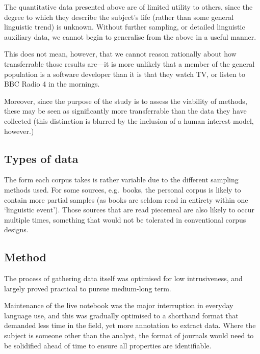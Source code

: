 

The quantitative data presented above are of limited utility to others, since the degree to which they describe the subject's life (rather than some general linguistic trend) is unknown.  Without further sampling, or detailed linguistic auxiliary data, we cannot begin to generalise from the above in a useful manner.

This does not mean, however, that we cannot reason rationally about how transferrable those results are---it is more unlikely that a member of the general population is a software developer than it is that they watch TV, or listen to BBC Radio 4 in the mornings.

Moreover, since the purpose of the study is to assess the viability of methods, these may be seen as significantly more transferrable than the data they have collected (this distinction is blurred by the inclusion of a human interest model, however.)




\subsection{Types of data}
The form each corpus takes is rather variable due to the different sampling methods used.  For some sources, e.g.\ books, the personal corpus is likely to contain more partial samples (as books are seldom read in entirety within one `linguistic event').  Those sources that are read piecemeal are also likely to occur multiple times, something that would not be tolerated in conventional corpus designs.




\subsection{Method}
The process of gathering data itself was optimised for low intrusiveness, and largely proved practical to pursue medium-long term.

Maintenance of the live notebook was the major interruption in everyday language use, and this was gradually optimised to a shorthand format that demanded less time in the field, yet more annotation to extract data.  Where the subject is someone other than the analyst, the format of journals would need to be solidified ahead of time to ensure all properties are identifiable.

